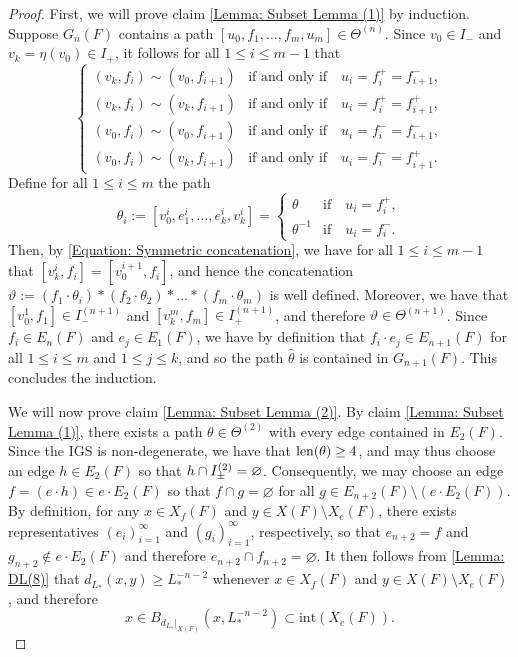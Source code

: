 \documentclass{amsart}
\newcommand{\len}{{\rm len}}
\numberwithin{equation}{section}
\theoremstyle{definition}
\theoremstyle{remark}
\begin{document}
\begin{proof}
    First, we will prove claim \eqref{Lemma: Subset Lemma (1)} by induction. Suppose \(G_n(F)\) contains a path \([u_0,f_1,\ldots,f_m,u_m]\in \Theta^{(n)}\). Since \(v_0\in I_-\) and \(v_k=\eta(v_0)\in I_+\), it follows for all \(1\leq i\leq m-1\) that
        \begin{equation}\label{Equation: Symmetric concatenation}
        \begin{cases}
            (v_k,f_i)\sim (v_0,f_{i+1})&\text{if and only if}\quad u_i=f_i^+=f_{i+1}^-,\\
            (v_k,f_i)\sim (v_k,f_{i+1})&\text{if and only if}\quad u_i=f_i^+=f_{i+1}^+,\\
            (v_0,f_i)\sim (v_0,f_{i+1})&\text{if and only if}\quad u_i=f_i^-=f_{i+1}^-,\\
            (v_0,f_i)\sim (v_k,f_{i+1})&\text{if and only if}\quad u_i=f_i^-=f_{i+1}^+.
        \end{cases}
        \end{equation}
    Define for all \(1\leq i\leq m\) the path
        \[
            \theta_i:=[v^i_0,e^i_1,\ldots,e^i_k,v^i_k]=\begin{cases}
                \theta&\text{if}\quad u_i=f_i^+,\\
                \theta^{-1}&\text{if}\quad u_i=f_i^-.
            \end{cases}
        \]
    Then, by \eqref{Equation: Symmetric concatenation}, we have for all \(1\leq i\leq m-1\) that \([v^i_k,f_i]=[v^{i+1}_0,f_i]\), and hence the concatenation \(\vartheta:=(f_1\cdot\theta_i)* (f_2\cdot\theta_2)*\ldots *(f_m\cdot\theta_m) \) is well defined. Moreover, we have that \([v^1_0,f_1]\in I^{(n+1)}_-\) and \([v^m_k,f_m]\in I^{(n+1)}_+\), and therefore \(\vartheta\in\Theta^{(n+1)}\). Since \(f_i\in E_n(F)\) and \(e_j\in E_1(F)\), we have by definition that \(f_i\cdot e_j\in E_{n+1}(F)\) for all \(1\leq i\leq m\) and \(1\leq j\leq k\), and so the path \(\hat{\theta}\) is contained in \(G_{n+1}(F)\). This concludes the induction.
    \vspace{5pt}

    We will now prove claim \eqref{Lemma: Subset Lemma (2)}. By claim \eqref{Lemma: Subset Lemma (1)}, there exists a path \(\theta\in\Theta^{(2)}\) with every edge contained in \(E_2(F)\). Since the IGS is non-degenerate, we have that \(\len(\theta)\geq 4\), and may thus choose an edge \(h\in E_2(F)\) so that \(h\cap I_{\pm}^{\smash{(2)}}=\varnothing\). Consequently, we may choose an edge \(f=(e\cdot h)\in e\cdot E_2(F)\) so that \(f\cap g=\varnothing\) for all \(g\in E_{n+2}(F)\setminus (e\cdot E_2(F))\). By definition, for any \(x\in X_f(F)\) and \(y\in X(F)\setminus X_e(F)\), there exists representatives \((e_i)_{i=1}^\infty\) and \((g_i)_{i=1}^\infty\), respectively, so that \(e_{n+2}=f\) and \(g_{n+2}\not\in e\cdot E_2(F)\) and therefore \(e_{n+2}\cap f_{n+2}=\varnothing\). It then follows from \ref{Lemma: DL(8)} that \(d_{L_*}(x,y)\geq L_*^{-n-2}\) whenever \(x\in X_f(F) \) and \(y\in X(F)\setminus X_e(F)\), and therefore
        \[
            x\in B_{d_{L_*}\vert_{X(F)}}(x,L_*^{-n-2})\subset \mathrm{int}(X_e(F)).
        \]


\end{proof}
\end{document}
